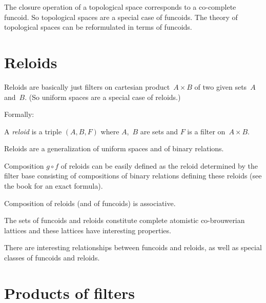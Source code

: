 \documentclass{amsart}
\begin{document}
The closure operation of a topological space corresponds to a co-complete funcoid. So topological spaces are a special case of funcoids. The theory of topological spaces can be reformulated in terms of funcoids.

\section{Reloids}

Reloids are basically just filters on cartesian product~$A\times B$ of two given sets~$A$ and~$B$. (So uniform spaces are a special case of reloids.)

Formally:

\begin{defn}
A \emph{reloid} is a triple $(A,B,F)$ where $A$,~$B$ are sets and $F$ is a filter on~$A\times B$.
\end{defn}

Reloids are a generalization of uniform spaces and of binary relations.

\begin{defn}
Composition $g\circ f$ of reloids can be easily defined as the reloid determined by the filter base
consisting of compositions of binary relations defining these reloids (see the book for an exact formula).
\end{defn}

\begin{prop}
Composition of reloids (and of funcoids) is associative.
\end{prop}

The sets of funcoids and reloids constitute complete atomistic co-brouwerian lattices and these lattices have interesting
properties.

There are interesting relationships between funcoids and reloids, as well as special classes of funcoids and reloids.

\section{Products of filters}
\end{document}
